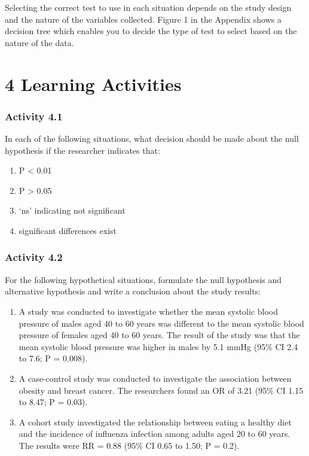 \documentclass[
]{memoir}
\providecommand{\tightlist}{%
  \setlength{\itemsep}{0pt}\setlength{\parskip}{0pt}}
\begin{document}
Selecting the correct test to use in each situation depends on the study design and the nature of the variables collected. Figure 1 in the Appendix shows a decision tree which enables you to decide the type of test to select based on the nature of the data.

\hypertarget{learning-activities-3}{%
\chapter*{\texorpdfstring{\textbf{4} Learning Activities}{4 Learning Activities}}\label{learning-activities-3}}

\hypertarget{activity-4.1}{%
\subsection{Activity 4.1}\label{activity-4.1}}

In each of the following situations, what decision should be made about the null hypothesis if the researcher indicates that:

\begin{enumerate}
\def\labelenumi{\alph{enumi})}
\tightlist
\item
  P \textless{} 0.01
\item
  P \textgreater{} 0.05
\item
  `ns' indicating not significant
\item
  significant differences exist
\end{enumerate}

\hypertarget{activity-4.2}{%
\subsection{Activity 4.2}\label{activity-4.2}}

For the following hypothetical situations, formulate the null hypothesis and alternative hypothesis and write a conclusion about the study results:

\begin{enumerate}
\def\labelenumi{\alph{enumi})}
\tightlist
\item
  A study was conducted to investigate whether the mean systolic blood pressure of males aged 40 to 60 years was different to the mean systolic blood pressure of females aged 40 to 60 years. The result of the study was that the mean systolic blood pressure was higher in males by 5.1 mmHg (95\% CI 2.4 to 7.6; P = 0.008).
\item
  A case-control study was conducted to investigate the association between obesity and breast cancer. The researchers found an OR of 3.21 (95\% CI 1.15 to 8.47; P = 0.03).
\item
  A cohort study investigated the relationship between eating a healthy diet and the incidence of influenza infection among adults aged 20 to 60 years. The results were RR = 0.88 (95\% CI 0.65 to 1.50; P = 0.2).
\end{enumerate}
\end{document}
